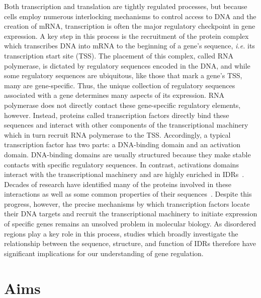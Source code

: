 Both transcription and translation are tightly regulated processes, but because cells employ numerous interlocking mechanisms to control access to DNA and the creation of mRNA, transcription is often the major regulatory checkpoint in gene expression. A key step in this process is the recruitment of the protein complex which transcribes DNA into mRNA to the beginning of a gene's sequence, \textit{i.e.} its transcription start site (TSS). The placement of this complex, called RNA polymerase, is dictated by regulatory sequences encoded in the DNA, and while some regulatory sequences are ubiquitous, like those that mark a gene's TSS, many are gene-specific. Thus, the unique collection of regulatory sequences associated with a gene determines many aspects of its expression. RNA polymerase does not directly contact these gene-specific regulatory elements, however. Instead, proteins called transcription factors directly bind these sequences and interact with other components of the transcriptional machinery which in turn recruit RNA polymerase to the TSS. Accordingly, a typical transcription factor has two parts: a DNA-binding domain and an activation domain. DNA-binding domains are usually structured because they make stable contacts with specific regulatory sequences. In contrast, activations domains interact with the transcriptional machinery and are highly enriched in IDRs~\cite{Liu2006}. Decades of research have identified many of the proteins involved in these interactions as well as some common properties of their sequences~\cite{Ma1987, Sigler1988, Gerber1994, Arnold2018, Staller2018, Erijman2020, Sanborn2021}. Despite this progress, however, the precise mechanisms by which transcription factors locate their DNA targets and recruit the transcriptional machinery to initiate expression of specific genes remains an unsolved problem in molecular biology. As disordered regions play a key role in this process, studies which broadly investigate the relationship between the sequence, structure, and function of IDRs therefore have significant implications for our understanding of gene regulation.

\section{Aims}

